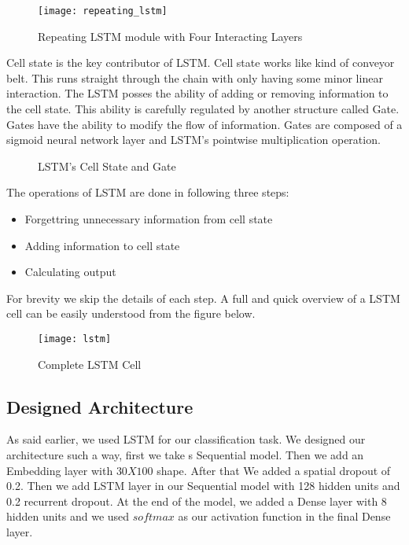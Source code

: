 \begin{figure}[h]
    \centering
    \texttt{[image: repeating\_lstm]}
    \caption{Repeating LSTM module with Four Interacting Layers~\cite{colah2015}}
\end{figure}
\vline

Cell state is the key contributor of LSTM. Cell state works like kind of conveyor belt. This runs straight through the chain with only having some minor linear interaction. The LSTM posses the ability of adding or removing information to the cell state. This ability is carefully regulated by another structure called Gate. \\

Gates have the ability to modify the flow of information. Gates are composed of a sigmoid neural network layer and LSTM's pointwise multiplication operation. \\

\begin{figure}%
    \centering
    \qquad
    \caption{LSTM's Cell State and Gate}%
\end{figure}
\vline

The operations of LSTM are done in following three steps:
\begin{itemize}
    \item Forgettring unnecessary information from cell state
    \item Adding information to cell state
    \item Calculating output
\end{itemize}

For brevity we skip the details of each step. A full and quick overview of a LSTM cell can be easily understood from the figure below. \\

\begin{figure}[h]
    \centering
    \texttt{[image: lstm]}
    \caption{Complete LSTM Cell~\cite{colah2015}}
\end{figure}
\vline


\subsection{Designed Architecture}		
As said earlier, we used LSTM for our classification task. We designed our architecture such a way, first we take s Sequential model. Then we add an Embedding layer with $30X100$ shape. After that We added a spatial dropout of 0.2. Then we add LSTM layer in our Sequential model with 128 hidden units and 0.2 recurrent dropout. At the end of the model, we added a Dense layer with 8 hidden units and we used $softmax$ as our activation function in the final Dense layer. \\

